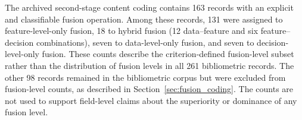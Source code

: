 \documentclass[]{interact}
\theoremstyle{plain}%
\theoremstyle{definition}
\theoremstyle{remark}
\DeclareRobustCommand{\DIFadd}[1]{{\protect\color{DIFaddcolor}\uwave{#1}}}
\DeclareRobustCommand{\DIFdel}[1]{{\protect\color{DIFdelcolor}\sout{#1}}}
\def\DIFadd#1{#1}%
\def\DIFdel#1{}%
\begin{document}
\DIFadd{The} \DIFadd{archived} \DIFadd{second-stage} \DIFadd{content} \DIFadd{coding} \DIFadd{contains} \DIFadd{163} \DIFadd{records} \DIFadd{with} \DIFadd{an} \DIFadd{explicit} \DIFadd{and} \DIFadd{classifiable} \DIFadd{fusion} \DIFadd{operation}\DIFadd{.} \DIFadd{Among} \DIFadd{these} \DIFadd{records}\DIFadd{,} \DIFadd{131} \DIFadd{were} \DIFadd{assigned} \DIFadd{to} \DIFadd{feature-level-only} \DIFadd{fusion}\DIFadd{,} \DIFadd{18} \DIFadd{to} \DIFadd{hybrid} \DIFadd{fusion} \DIFadd{(}\DIFadd{12} \DIFadd{data--feature} \DIFadd{and} \DIFadd{six} \DIFadd{feature--decision} \DIFadd{combinations}\DIFadd{)}\DIFadd{,} \DIFadd{seven} \DIFadd{to} \DIFadd{data-level-only} \DIFadd{fusion}\DIFadd{,} \DIFadd{and} \DIFadd{seven} \DIFadd{to} \DIFadd{decision-level-only} \DIFadd{fusion}\DIFadd{.} \DIFadd{These} \DIFadd{counts} \DIFadd{describe} the \DIFdel{shift} \DIFdel{toward} \DIFdel{modern} \DIFdel{architectures}\DIFdel{,} \DIFdel{we} \DIFdel{analyzed} \DIFadd{criterion-defined} \DIFadd{fusion-level} \DIFadd{subset} \DIFadd{rather} \DIFadd{than} the distribution of \DIFdel{methodological} \DIFdel{approaches} \DIFdel{within} \DIFdel{the} \DIFdel{sampled} \DIFdel{literature} \DIFadd{fusion} \DIFadd{levels} \DIFadd{in} \DIFadd{all} \DIFadd{261} \DIFadd{bibliometric} \DIFadd{records}. \DIFdel{Here}\DIFdel{,} \DIFdel{feature-level} \DIFdel{fusion} \DIFdel{has} \DIFdel{emerged} \DIFdel{as} \DIFdel{the} \DIFdel{absolute} \DIFdel{dominant} \DIFdel{paradigm}\DIFdel{,} \DIFdel{accounting} \DIFdel{for} \DIFdel{80}\DIFdel{.}\DIFdel{9} \DIFdel{of} \DIFdel{the} \DIFdel{studies}\DIFdel{.} \DIFdel{This} \DIFdel{is} \DIFdel{followed} \DIFdel{by} \DIFdel{hybrid} \DIFdel{Data}\DIFdel{+}\DIFdel{Feature} \DIFdel{fusion} \DIFdel{(}\DIFdel{7}\DIFdel{.}\DIFdel{4}\DIFdel{)} \DIFdel{and} \DIFdel{decision-level} \DIFdel{fusion} \DIFdel{(}\DIFdel{4}\DIFdel{.}\DIFdel{3}\DIFdel{)}\DIFdel{.} \DIFdel{This} \DIFdel{distribution} \DIFdel{underlines} \DIFdel{a} \DIFdel{significant} \DIFdel{shift} \DIFadd{The} \DIFadd{other} \DIFadd{98} \DIFadd{records} \DIFadd{remained} in the \DIFdel{research} \DIFdel{community} \DIFdel{towards} \DIFdel{integrating} \DIFdel{high-level} \DIFdel{semantic} \DIFdel{features} \DIFdel{rather} \DIFdel{than} \DIFdel{relying} \DIFdel{on} \DIFdel{raw} \DIFdel{signal} \DIFdel{concatenation} \DIFadd{bibliometric} \DIFadd{corpus} \DIFadd{but} \DIFadd{were} \DIFadd{excluded} \DIFadd{from} \DIFadd{fusion-level} \DIFadd{counts}\DIFadd{,} \DIFadd{as} \DIFadd{described} \DIFadd{in} \DIFadd{Section}\DIFadd{~}{\color{blue}\ref{sec:fusion_coding}}. The \DIFdel{prevalence} \DIFadd{counts} \DIFadd{are} \DIFadd{not} \DIFadd{used} \DIFadd{to} \DIFadd{support} \DIFadd{field-level} \DIFadd{claims} \DIFadd{about} \DIFadd{the} \DIFadd{superiority} \DIFadd{or} \DIFadd{dominance} of \DIFdel{feature-level} \DIFadd{any} fusion \DIFdel{is} \DIFdel{deeply} \DIFdel{rooted} \DIFdel{in} \DIFdel{the} \DIFdel{surge} \DIFdel{of} \DIFdel{deep} \DIFdel{learning} \DIFdel{techniques} \DIFadd{level}.
\end{document}
